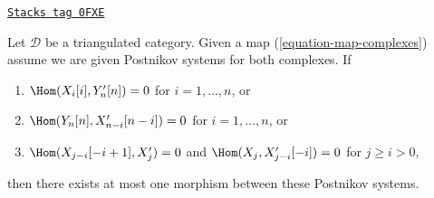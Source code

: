\begin{lemma}
\label{derived-lemma-uniqueness-maps-postnikov-systems}
\href{https://stacks.math.columbia.edu/tag/0FXE}{\texttt{Stacks tag 0FXE}}

Let $\mathcal{D}$ be a triangulated category. Given a map
(\ref{equation-map-complexes}) assume we are given
Postnikov systems for both complexes. If
\begin{enumerate}
\item $\Hom(X_i[i], Y'_n[n]) = 0$ for $i = 1, \ldots, n$, or
\item $\Hom(Y_n[n], X'_{n - i}[n - i]) = 0$ for $i = 1, \ldots, n$, or
\item $\Hom(X_{j - i}[-i + 1], X'_j) = 0$ and
$\Hom(X_j, X'_{j - i}[-i]) = 0$ for $j \geq i > 0$,
\end{enumerate}
then there exists at most one morphism between these Postnikov systems.
\end{lemma}

